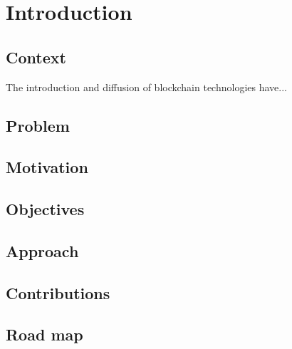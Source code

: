 \chapter{Introduction}

\section{Context}
The introduction and diffusion of blockchain technologies have...

\section{Problem}

\section{Motivation}

\section{Objectives}

\section{Approach}

\section{Contributions}

\section{Road map}